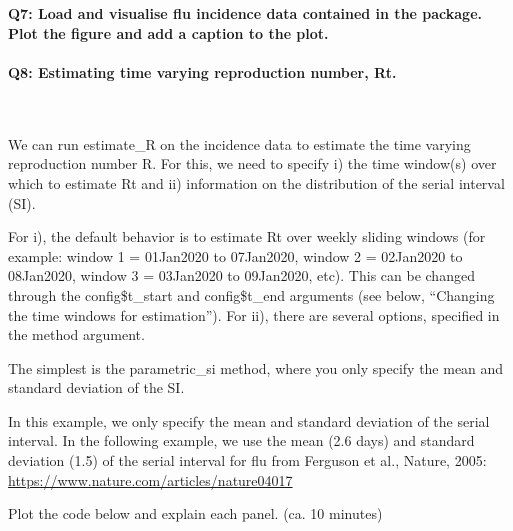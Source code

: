 \documentclass[
  11pt,
]{article}
\newenvironment{Shaded}{\begin{snugshade}}{\end{snugshade}}
\newcommand{\AttributeTok}[1]{\textcolor[rgb]{0.77,0.63,0.00}{#1}}
\newcommand{\ConstantTok}[1]{\textcolor[rgb]{0.00,0.00,0.00}{#1}}
\newcommand{\FloatTok}[1]{\textcolor[rgb]{0.00,0.00,0.81}{#1}}
\newcommand{\FunctionTok}[1]{\textcolor[rgb]{0.00,0.00,0.00}{#1}}
\newcommand{\NormalTok}[1]{#1}
\newcommand{\OtherTok}[1]{\textcolor[rgb]{0.56,0.35,0.01}{#1}}
\newcommand{\SpecialCharTok}[1]{\textcolor[rgb]{0.00,0.00,0.00}{#1}}
\newcommand{\StringTok}[1]{\textcolor[rgb]{0.31,0.60,0.02}{#1}}
\begin{document}
~

\hypertarget{q7-load-and-visualise-flu-incidence-data-contained-in-the-package.-plot-the-figure-and-add-a-caption-to-the-plot.}{%
\paragraph{Q7: Load and visualise flu incidence data contained in the
package. Plot the figure and add a caption to the
plot.}\label{q7-load-and-visualise-flu-incidence-data-contained-in-the-package.-plot-the-figure-and-add-a-caption-to-the-plot.}}

\hypertarget{q8-estimating-time-varying-reproduction-number-rt.}{%
\paragraph{Q8: Estimating time varying reproduction number,
Rt.}\label{q8-estimating-time-varying-reproduction-number-rt.}}

~

We can run estimate\_R on the incidence data to estimate the time
varying reproduction number R. For this, we need to specify i) the time
window(s) over which to estimate Rt and ii) information on the
distribution of the serial interval (SI).

For i), the default behavior is to estimate Rt over weekly sliding
windows (for example: window 1 = 01Jan2020 to 07Jan2020, window 2 =
02Jan2020 to 08Jan2020, window 3 = 03Jan2020 to 09Jan2020, etc). This
can be changed through the config\$t\_start and config\$t\_end arguments
(see below, ``Changing the time windows for estimation''). For ii),
there are several options, specified in the method argument.

The simplest is the parametric\_si method, where you only specify the
mean and standard deviation of the SI.

In this example, we only specify the mean and standard deviation of the
serial interval. In the following example, we use the mean (2.6 days)
and standard deviation (1.5) of the serial interval for flu from
Ferguson et al., Nature, 2005:
\url{https://www.nature.com/articles/nature04017}

Plot the code below and explain each panel. (ca. 10 minutes)

\begin{Shaded}
\end{Shaded}
\end{document}
